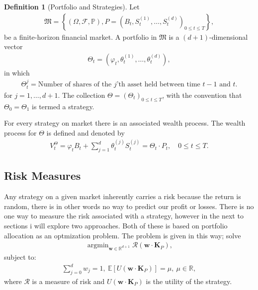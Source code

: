 \documentclass{article}
\theoremstyle{definition}
\newtheorem{definition}[theorem]{Definition}
\numberwithin{equation}{section}
\DeclareMathOperator*{\argmin}{argmin}
\begin{document}
\begin{definition}[Portfolio and Strategies]
    Let
    \begin{align}
        \mathfrak{M} = \left\{ 
            \left(
                \Omega, \mathscr{F}, \mathbb{P}
            \right),
            P = \left(
                B_t, S_t^{(1)}, \ldots, S_t^{(d)}
            \right)_{0 \leq t \leq T}
         \right\},
    \end{align}
    be a finite-horizon financial market.
    A portfolio in $\mathfrak{M}$ is a $(d + 1)$-dimensional vector
    \begin{align}
        \Theta_t = \left(\varphi_t, \theta_t^{(1)}, \ldots, \theta_t^{(d)}\right),
    \end{align}
    in which
    \begin{align}
        \Theta_t^j = \text{Number of shares of the $j$'th asset held between time $t-1$ and $t$}.
    \end{align}
    for $j = 1, \ldots, d + 1$.
    The collection $\Theta = \left( \Theta_t \right)_{0 \leq t \leq T}$, with the convention that $\Theta_0 = \Theta_1$ is termed a strategy.
\end{definition}
For every strategy on market there is an associated wealth process.
The wealth process for $\Theta$ is defined and denoted by
\begin{align}
    V_t^{\Theta} = \varphi_t B_t + \sum_{j = 1}^d \theta_t^{(j)} S_t^{(j)} = \Theta_t \cdot P_t, \quad 0 \leq t \leq T.    
\end{align}

\subsection{Risk Measures}
Any strategy on a given market inherently carries a risk because the return is random, there is in other words no way to predict our profit or losses.
There is no one way to measure the risk associated with a strategy, however in the next to sections i will explore two approaches.
Both of these is based on portfolio allocation as an optmization problem.
The problem is given in this way; solve
\begin{align}
    \argmin_{\mathbf{w}\in\mathbb{R}^{d+1}}
    \mathcal{R}\left( \mathbf{w} \cdot \mathbf{K}_P \right),
\end{align}
subject to:
\begin{align}
    \sum_{j = 0}^d w_j = 1, \ 
    \mathbb{E}\left[ U(\mathbf{w} \cdot \mathbf{K}_P) \right] = \mu, \
    \mu \in \mathbb{R},
\end{align}
where $\mathcal{R}$ is a measure of risk and $U(\mathbf{w} \cdot \mathbf{K}_P)$ is the utility of the strategy.
\end{document}
